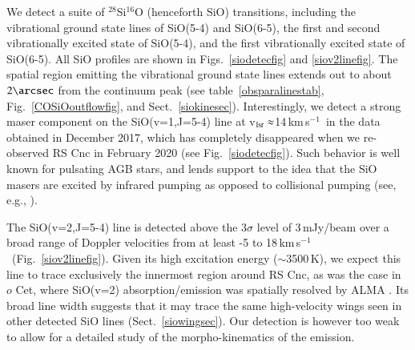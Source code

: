\documentclass{aa}
\newcommand{\kms}{\,km\,s$^{-1}$~}
\begin{document}
We detect a suite of $^{28}$Si$^{16}$O (henceforth SiO) transitions,
including the vibrational ground state lines of SiO(5-4) and SiO(6-5),
the first and second vibrationally excited state of SiO(5-4), and the
first vibrationally excited state of SiO(6-5). All SiO profiles are
shown in Figs.~\ref{siodetecfig} and \ref{siov2linefig}. 
The spatial region emitting the vibrational ground state lines
extends out to about $2\arcsec$ from the continuum peak (see
table~\ref{obsparalinestab}, Fig.~\ref{COSiOoutflowfig}, and
Sect.~\ref{siokinesec}).
Interestingly, we detect a strong maser
component on the SiO(v=1,J=5-4) line at v$_{\rm lsr}\approx$14\kms in
the data obtained in December 2017, which has completely disappeared
when we re-observed RS Cnc in February 2020 (see
Fig.~\ref{siodetecfig}). Such behavior is well known for pulsating AGB
stars, and lends support to the idea that the SiO masers are excited by
infrared pumping as opposed to collisional pumping (see, e.g.,
\citet{pardoetal2004}).

The SiO(v=2,J=5-4) line is detected above the 3$\sigma$ level of
3\,mJy/beam over a broad range of Doppler velocities from at least -5
to 18\kms (Fig.~\ref{siov2linefig}).  Given its high excitation energy
($\sim$3500\,K), we expect this line to trace exclusively the
innermost region around RS Cnc, as was the case in $o$ Cet, where
SiO(v=2) absorption/emission was spatially resolved by ALMA
\citep{wongetal2016}.  Its broad line width suggests that it may trace
the same high-velocity wings seen in other detected SiO lines
(Sect.~\ref{siowingsec}).  Our detection is however too weak to allow
for a detailed study of the morpho-kinematics of the emission.
\end{document}
